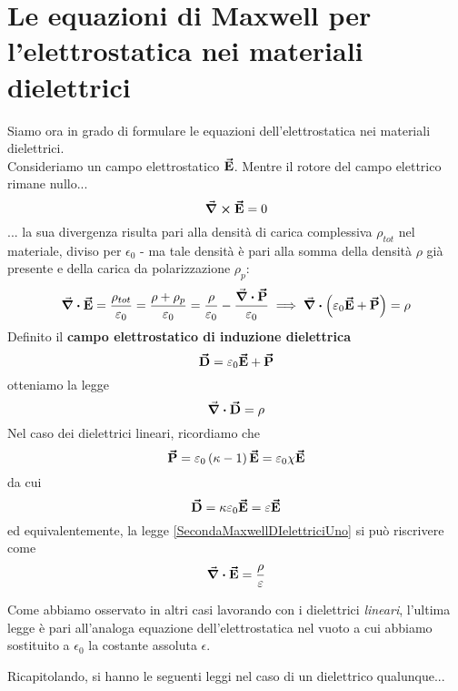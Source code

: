\section{Le equazioni di Maxwell per l'elettrostatica nei materiali dielettrici}
Siamo ora in grado di formulare le equazioni dell'elettrostatica nei materiali dielettrici.\\
Consideriamo un campo elettrostatico $\vb*{\va{E}}$. Mentre il rotore del campo elettrico rimane nullo...
\begin{equation}
	\curl{\vb*{\va{E}}}=0
\end{equation}
... la sua divergenza risulta pari alla densità di carica complessiva $\rho_{tot}$ nel materiale, diviso per $\epsilon_0$ - ma tale densità è pari alla somma della densità $\rho$ già presente e della carica da polarizzazione $\rho_p$:
\begin{equation*}
	\div{\vb*{\va{E}}}=\frac{\rho_{tot}}{\varepsilon_0}=\frac{\rho+\rho_p}{\varepsilon_0}=\frac{\rho}{\varepsilon_0}-\frac{\div{\vb*{\va{P}}}}{\varepsilon_0}\implies \div{\left(\varepsilon_0\vb*{\va{E}}+\vb*{\va{P}}\right)}=\rho
\end{equation*}
Definito il \textbf{campo elettrostatico di induzione dielettrica}
\begin{equation}
	\vb*{\va{D}}=\varepsilon_0\vb*{\va{E}}+\vb*{\va{P}}
\end{equation}
otteniamo la legge
\begin{equation}
	\div{\vb*{\va{D}}}=\rho\label{SecondaMaxwellDIelettriciUno}
\end{equation}
Nel caso dei dielettrici lineari, ricordiamo che
\begin{equation*}
	\vb*{\va{P}}=\varepsilon_0\left(\kappa-1\right)\vb*{\va{E}}=\varepsilon_0\chi\vb*{\va{E}}
\end{equation*}
da cui
\begin{equation*}
	\vb*{\va{D}}=\kappa\varepsilon_0\vb*{\va{E}}=\varepsilon\vb*{\va{E}}
\end{equation*}
ed equivalentemente, la legge \eqref{SecondaMaxwellDIelettriciUno} si può riscrivere come
\begin{equation}
	\div{\vb*{\va{E}}}=\frac{\rho}{\varepsilon}
\end{equation} 
\begin{observe}
 Come abbiamo osservato in altri casi lavorando con i dielettrici \textit{lineari}, l'ultima legge è pari all'analoga equazione dell'elettrostatica nel vuoto a cui abbiamo sostituito a $\epsilon_0$ la costante assoluta $\epsilon$.
\end{observe}
Ricapitolando, si hanno le seguenti leggi nel caso di un dielettrico qualunque...

